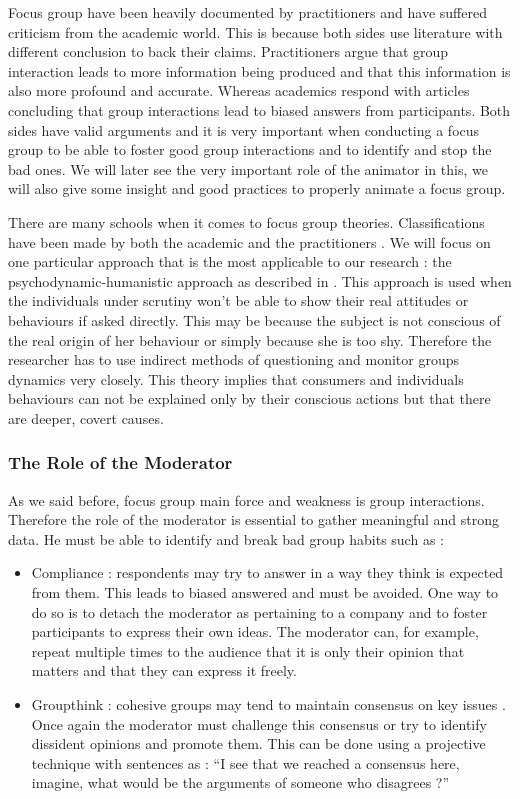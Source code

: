 \documentclass[10pt]{report}
\begin{document}
Focus group have been heavily documented by practitioners and have suffered criticism from the academic world. This is because both sides use literature with different conclusion to back their claims. Practitioners argue that group interaction leads to more information being produced and that this information is also more profound and accurate. Whereas academics respond with articles concluding that group interactions lead to biased answers from participants. Both sides have valid arguments and it is very important when conducting a focus group to be able to foster good group interactions and to identify and stop the bad ones. We will later see the very important role of the animator in this, we will also give some insight and good practices to properly animate a focus group.

There are many schools when it comes to focus group theories. Classifications have been made by both the academic \autocite{Calder1977} and the practitioners \autocite{Imms2002}. We will focus on one particular approach that is the most applicable to our research : the psychodynamic-humanistic approach as described in \autocite{belk2007handbook}. This approach is used when the individuals under scrutiny won't be able to show their real attitudes or behaviours if asked directly. This may be because the subject is not conscious of the real origin of her behaviour or simply because she is too shy. Therefore the researcher has to use indirect methods of questioning and monitor groups dynamics very closely. This theory implies that consumers and individuals behaviours can not be explained only by their conscious actions but that there are deeper, covert causes.

\subsubsection{The Role of the Moderator}

As we said before, focus group main force and weakness is group interactions. Therefore the role of the moderator is essential to gather meaningful and strong data. He must be able to identify and break bad group habits such as :
\begin{itemize}
\item Compliance : respondents may try to answer in a way they think is expected from them. This leads to biased answered and must be avoided. One way to do so is to detach the moderator as pertaining to a company and to foster participants to express their own ideas. The moderator can, for example, repeat multiple times to the audience that it is only their opinion that matters and that they can express it freely.
\item Groupthink : cohesive groups may tend to maintain consensus on key issues \autocite{Janis1982}. Once again the moderator must challenge this consensus or try to identify dissident opinions and promote them. This can be done using a projective technique with sentences as : \enquote{I see that we reached a consensus here, imagine, what would be the arguments of someone who disagrees ?}
\end{itemize}
\end{document}
